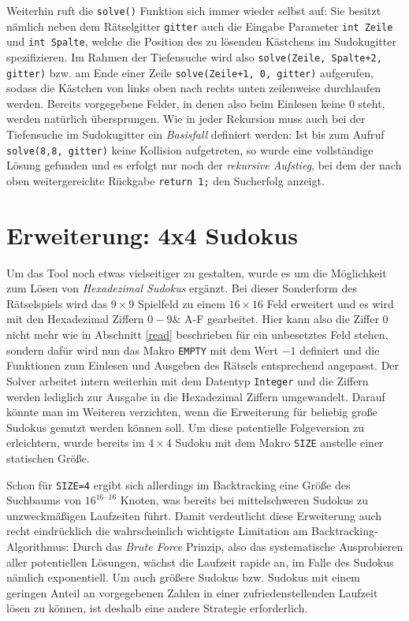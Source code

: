 \documentclass[a4paper,10pt]{article}
\begin{document}
Weiterhin ruft die \verb|solve()| Funktion sich immer wieder selbst auf: Sie besitzt nämlich neben dem Rätselgitter \verb|gitter| auch die Eingabe Parameter \verb|int Zeile| und \verb|int Spalte|, welche die Position des zu lösenden Kästchens im Sudokugitter spezifizieren. Im Rahmen der Tiefensuche wird also \verb|solve(Zeile, Spalte+2, gitter)| bzw. am Ende einer Zeile \verb|solve(Zeile+1, 0, gitter)| aufgerufen, sodass die Kästchen von links oben nach rechts unten zeilenweise durchlaufen werden. Bereits vorgegebene Felder, in denen also beim Einlesen keine $0$ steht, werden natürlich übersprungen.\linebreak 
Wie in jeder Rekursion muss auch bei der Tiefensuche im Sudokugitter ein \textit{Basisfall} definiert werden: Ist bis zum Aufruf \verb|solve(8,8, gitter)| keine Kollision aufgetreten, so wurde eine vollständige Lösung gefunden und es erfolgt nur noch der \textit{rekursive Aufstieg}, bei dem der nach oben weitergereichte Rückgabe \verb|return 1;| den Sucherfolg anzeigt.

\section{Erweiterung: 4x4 Sudokus}
Um das Tool noch etwas vielseitiger zu gestalten, wurde es um die Möglichkeit zum Lösen von \textit{Hexadezimal Sudokus} ergänzt. Bei dieser Sonderform des Rätselspiels wird das $9\times9$ Spielfeld zu einem $ 16\times16 $ Feld erweitert und es wird mit den Hexadezimal Ziffern $0-9\&$ A-F gearbeitet. Hier kann also die Ziffer $0$ nicht mehr wie in Abschnitt \ref{read} beschrieben für ein unbesetztes Feld stehen, sondern dafür wird nun das Makro \verb|EMPTY| mit dem Wert $-1$ definiert und die Funktionen zum Einlesen und Ausgeben des Rätsels entsprechend angepasst. Der Solver arbeitet intern weiterhin mit dem Datentyp \verb|Integer| und die Ziffern werden lediglich zur Ausgabe in die Hexadezimal Ziffern umgewandelt. Darauf könnte man im Weiteren verzichten, wenn die Erweiterung für beliebig große Sudokus genutzt werden können soll. 
Um diese potentielle Folgeversion zu erleichtern, wurde bereits im $4\times4$ Sudoku mit dem Makro \verb|SIZE| anstelle einer statischen Größe.

Schon für \verb|SIZE=4| ergibt sich allerdings im Backtracking eine Größe des Suchbaums von $ 16^{16\cdot 16} $ Knoten, was bereits bei mittelschweren Sudokus zu unzweckmäßigen Laufzeiten führt. Damit verdeutlicht diese Erweiterung auch recht eindrücklich die wahrscheinlich wichtigste Limitation am Backtracking-Algorithmus: Durch das \textit{Brute Force} Prinzip, also das systematische Ausprobieren aller potentiellen Lösungen, wächst die Laufzeit rapide an, im Falle des Sudokus nämlich exponentiell. Um auch größere Sudokus bzw. Sudokus mit einem geringen Anteil an vorgegebenen Zahlen in einer zufriedenstellenden Laufzeit lösen zu können, ist deshalb eine andere Strategie erforderlich.
\end{document}
